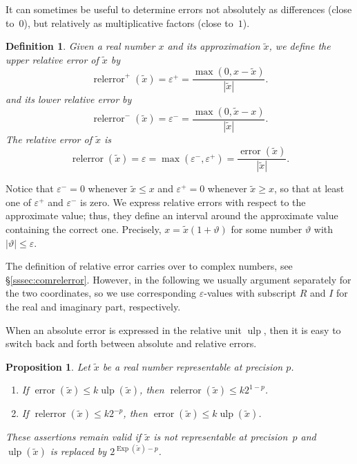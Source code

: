 \documentclass [11pt]{article}
\newcommand {\corr}[1]{{#1}}
\newcommand {\appro}[1]{\widetilde {#1}}
\newcommand {\Ulp}{{\operatorname {ulp}}}
\DeclareMathOperator{\Exp}{\operatorname {Exp}}
\newcommand{\error}{\operatorname {error}}
\newcommand{\relerror}{\operatorname {relerror}}
\renewcommand {\epsilon}{\varepsilon}
\renewcommand {\theta}{\vartheta}
\renewcommand {\leq}{\leqslant}
\renewcommand {\geq}{\geqslant}
\newtheorem{definition}[theorem]{Definition}
\newtheorem{prop}[theorem]{Proposition}
\begin{document}
It can sometimes be useful to determine errors not absolutely as differences
(close to~$0$),
but relatively as multiplicative factors (close to~$1$).

\begin {definition}
\label {def:relerror}
Given a real number $\corr x$ and its approximation $\appro x$,
we define the {\em upper relative error} of $\appro x$ by
\[
\relerror^+ (\appro x) = \epsilon^+
= \frac {\max (0, \corr x - \appro x)}{|\appro x|}.
\]
and its {\em lower relative error} by
\[
\relerror^- (\appro x) = \epsilon^-
= \frac {\max (0, \appro x - \corr x)}{|\appro x|}.
\]
The {\em relative error} of $\appro x$ is
\[
\relerror (\appro x) = \epsilon = \max (\epsilon^-, \epsilon^+)
= \frac {\error (\appro x)}{|\appro x|}.
\]
\end {definition}

Notice that $\epsilon^- = 0$ whenever $\appro x \leq \corr x$ and
$\epsilon^+ = 0$ whenever $\appro x \geq \corr x$, so that at least one of
$\epsilon^+$ and $\epsilon^-$ is zero. We express relative errors with
respect to the approximate value; thus, they define an interval around
the approximate value containing the correct one. Precisely,
$\corr x = \appro x (1 + \vartheta)$ for some number $\theta$ with
$|\theta| \leq \epsilon$.

The definition of relative error carries over to complex numbers,
see \S\ref {sssec:comrelerror}.
However, in the following we usually argument separately for the two coordinates,
so we use corresponding $\epsilon$-values with subscript $R$ and $I$ for the
real and imaginary part, respectively.

When an absolute error is expressed in the relative unit $\Ulp$, then
it is easy to switch back and forth between absolute and relative errors.

\begin {prop}
\label {prop:relerror}
Let $\appro x$ be a real number representable at precision $p$.
\begin {enumerate}
\item
If $\error (\appro x) \leq k \Ulp (\appro x)$,
then $\relerror (\appro x) \leq k 2^{1 - p}$.
\item
If $\relerror (\appro x) \leq k 2^{-p}$,
then $\error (\appro x) \leq k \Ulp (\appro x)$.
\end {enumerate}
These assertions remain valid if $\appro x$ is not representable at
precision~$p$ and $\Ulp (\appro x)$ is replaced by $2^{\Exp (\appro x) - p}$.
\end {prop}
\end{document}

